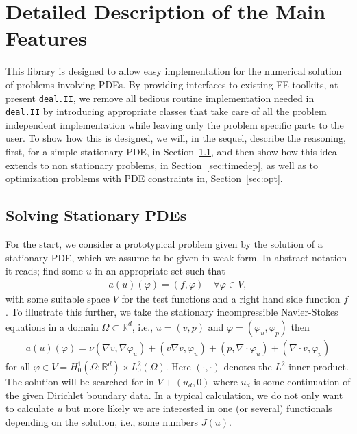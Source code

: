 \documentclass[smallextended]{svjour3}       %
\numberwithin{equation}{section}
\newcommand{\R}{\mathbb{R}}
\renewcommand{\phi}{\varphi}
\newcommand{\deal}{\texttt{deal.II}}
\begin{document}
\section{Detailed Description of the Main Features}
\label{detailed_description}
This library is designed to allow easy implementation for the numerical solution 
of problems involving PDEs.
By providing interfaces to existing FE-toolkits, at present \deal{}, 
we remove all tedious routine implementation needed in 
\deal{} by introducing appropriate classes that take care of all the 
problem independent implementation while leaving only the problem specific 
parts to the user. To show how this is designed, we will, in the sequel, 
describe the reasoning, first, for a simple stationary PDE, in 
Section~\ref{subsubsec:stationary problems}, and then show
how this idea extends to non stationary problems, in 
Section~\ref{sec:timedep}, as well as to optimization
problems with PDE constraints in, Section~\ref{sec:opt}. 

\subsection{Solving Stationary PDEs}
\label{subsubsec:stationary problems}
For the start, we consider a prototypical problem given by the solution of 
a stationary PDE, which we assume to be given in weak form.
In abstract notation it reads; find some $u$ in an appropriate set
such that
\begin{align}\label{eq:prototype_weak}
a(u)(\phi) = (f,\phi) \quad \forall \phi \in V,
\end{align}
with some suitable space $V$ for the test functions and a 
right hand side function $f$.
To illustrate this further, we take the stationary 
incompressible Navier-Stokes equations in a domain $\Omega \subset \R^d$, 
i.e., $u = (v,p)$ and $\phi = (\phi_u,\phi_p)$ then
\begin{align}\label{eq:ns}
a(u)(\phi) = \nu(\nabla v, \nabla\phi_u) + (v \nabla v,\phi_u) + (p, \nabla \cdot \phi_u) + (\nabla \cdot v ,\phi_p)
\end{align}
for all $\phi \in V = H^1_0(\Omega;\R^d) \times L^2_0(\Omega)$.
Here $(\cdot,\cdot)$ denotes the $L^2$-inner-product.
The solution will be searched for in $V + (u_d,0)$ where $u_d$ is some 
continuation of the given Dirichlet boundary data.
In a typical calculation, we do not only want to calculate $u$ but more likely we are 
interested in one (or several) functionals depending on the solution, i.e., some numbers $J(u)$.
\end{document}
